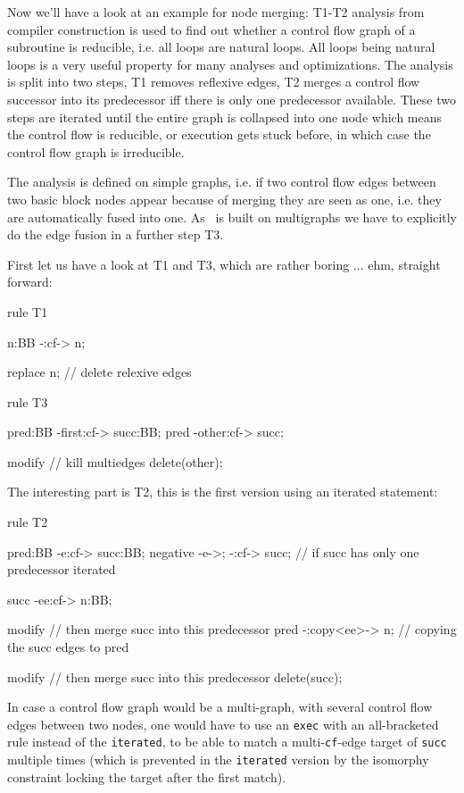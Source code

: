 Now we'll have a look at an example for node merging: T1-T2 analysis from compiler construction is used to find out whether a control flow graph of a subroutine is reducible, i.e. all loops are natural loops. All loops being natural loops is a very useful property for many analyses and optimizations. The analysis is split into two steps, T1 removes reflexive edges, T2 merges a control flow successor into its predecessor iff there is only one predecessor available. These two steps are iterated until the entire graph is collapsed into one node which means the control flow is reducible, or execution gets stuck before, in which case the control flow graph is irreducible.

The analysis is defined on simple graphs, i.e. if two control flow edges between two basic block nodes appear because of merging they are seen as one, i.e. they are automatically fused into one. As \GrG~is built on multigraphs we have to explicitly do the edge fusion in a further step T3.

First let us have a look at T1 and T3, which are rather boring ... ehm, straight forward:

  \begin{example}
    \begin{grgen}
rule T1 {
  n:BB -:cf-> n;

  replace {
    n; // delete relexive edges
  }
}
rule T3 {
  pred:BB -first:cf-> succ:BB;
  pred    -other:cf-> succ;

  modify { // kill multiedges
    delete(other);
  }
}
    \end{grgen}
  \end{example}

The interesting part is T2, this is the first version using an iterated statement:

  \begin{example}
    \begin{grgen}
rule T2 {
  pred:BB -e:cf-> succ:BB;
  negative {
    -e->;
    -:cf-> succ; // if succ has only one predecessor
  }
  iterated {
    succ -ee:cf-> n:BB;

    modify { // then merge succ into this predecessor
      pred -:copy<ee>-> n; // copying the succ edges to pred
    }
  }

  modify { // then merge succ into this predecessor
    delete(succ);
  }
}
    \end{grgen}
  \end{example}

In case a control flow graph would be a multi-graph, with several control flow edges between two nodes, one would have to use an \texttt{exec} with an all-bracketed rule instead of the \texttt{iterated}, to be able to match a multi-\texttt{cf}-edge target of \texttt{succ} multiple times (which is prevented in the \texttt{iterated} version by the isomorphy constraint locking the target after the first match).

